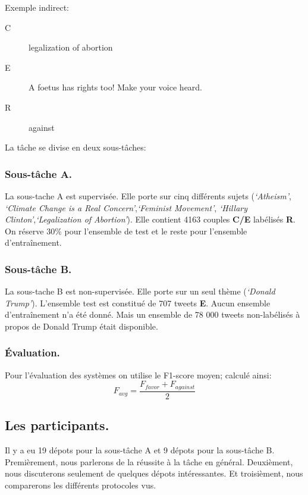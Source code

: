 \documentclass[11pt,a4paper,oldfontcommands]{memoir}
\begin{document}
Exemple indirect:
\begin{description}
 \item [C] legalization of abortion
 \item [E] A foetus has rights too! Make your voice heard.
 \item [R] against
\end{description}

\newpage
La tâche se divise en deux sous-tâches:

\subsubsection{Sous-tâche A.}
La sous-tache A est supervisée.
Elle porte sur cinq différents sujets (\textit{‘Atheism’},\textit{ ‘Climate Change is a Real Concern’},\textit{‘Feminist Movement’}, \textit{‘Hillary Clinton’},\textit{‘Legalization of Abortion’}).
Elle contient 4163 couples \textbf{C/E} labélisés \textbf{R}.
On réserve 30\% pour l'ensemble de test et le reste pour l'ensemble d'entraînement.

\subsubsection{Sous-tâche B.}
La sous-tache B est non-supervisée.
Elle porte sur un seul thème (\textit{‘Donald Trump’}).
L'ensemble test est constitué de 707 tweets \textbf{E}.
Aucun ensemble d'entraînement n'a été donné.
Mais un ensemble de 78 000 tweets non-labélisés à propos de Donald Trump était disponible.

\subsubsection{Évaluation.}
Pour l'évaluation des systèmes on utilise le F1-score moyen; calculé ainsi:
\begin{equation}
 F_{avg} = \frac{F_{favor}+F_{against}}{2}
\end{equation}

\subsection{Les participants.}
Il y a eu 19 dépots pour la sous-tâche A et 9 dépots pour la sous-tâche B.
Premièrement, nous parlerons de la réussite à la tâche en général.
Deuxièment, nous discuterons seulement de quelques dépots intéressantes.
Et troisièment, nous comparerons les différents protocoles vus.
\end{document}

